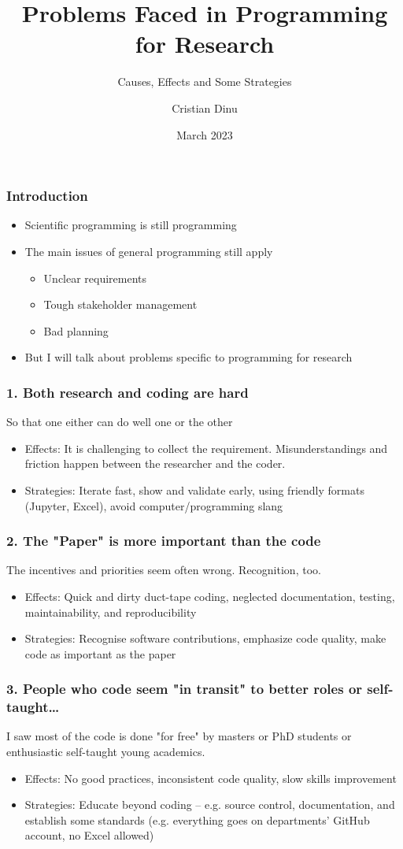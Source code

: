 \documentclass[14pt, aspectratio=169]{beamer}
\title{Problems Faced in Programming for Research}
\subtitle{Causes, Effects and Some Strategies}
\author{Cristian Dinu}
\date{March 2023}
\begin{document}
\frame{\titlepage}

\begin{frame}
\frametitle{Introduction}
\begin{itemize}
\item Scientific programming is still programming
\item The main issues of general programming still apply
    \begin{itemize}
    \item Unclear requirements
    \item Tough stakeholder management
    \item Bad planning
    \end{itemize}
\item But I will talk about problems specific to programming for research
\end{itemize}

\end{frame}

\begin{frame}
\frametitle{1. Both research and coding are hard}
So that one either can do well one or the other
\begin{itemize}
\item Effects: It is challenging to collect the requirement. Misunderstandings and friction happen between the researcher and the coder.
\item Strategies: Iterate fast, show and validate early, using friendly formats (Jupyter, Excel), avoid computer/programming slang
\end{itemize}
\end{frame}


\begin{frame}
\frametitle{2. The "Paper" is more important than the code}
The incentives and priorities seem often wrong. Recognition, too.
\begin{itemize}
\item Effects: Quick and dirty duct-tape coding, neglected documentation, testing, maintainability, and reproducibility
\item Strategies: Recognise software contributions, emphasize code quality, make code as important as the paper
\end{itemize}
\end{frame}

\begin{frame}
\frametitle{3. People who code seem "in transit" to better roles or self-taught\ldots}
I saw most of the code is done "for free" by masters or PhD students or enthusiastic self-taught young academics.
\newline
\begin{itemize}
    \item Effects: No good practices, inconsistent code quality, slow skills improvement
    \item Strategies: Educate beyond coding -- e.g. source control, documentation, and establish some standards (e.g. everything goes on departments' GitHub account, no Excel allowed)
\end{itemize}
\end{frame}
\end{document}
